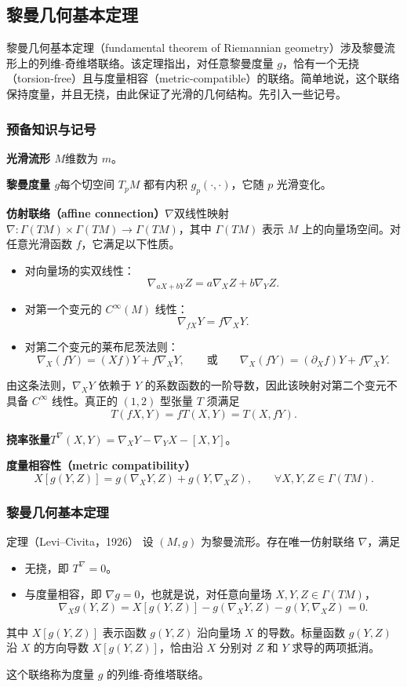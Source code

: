 \subsection{黎曼几何基本定理}
黎曼几何基本定理（fundamental theorem of Riemannian geometry）涉及黎曼流形上的列维-奇维塔联络。该定理指出，对任意黎曼度量 $g$，恰有一个无挠（torsion-free）且与度量相容（metric-compatible）的联络。简单地说，这个联络保持度量，并且无挠，由此保证了光滑的几何结构。先引入一些记号。

\subsubsection{预备知识与记号}
\textbf{光滑流形 $M$}\quad 维数为 $m$。

\textbf{黎曼度量 $g$}\quad 每个切空间 $T_pM$ 都有内积 $g_p(\cdot,\cdot)$，它随 $p$ 光滑变化。

\textbf{仿射联络（affine connection）$\nabla$}\quad 双线性映射
$\nabla\colon\Gamma(TM)\times\Gamma(TM)\to\Gamma(TM)$，其中 $\Gamma(TM)$ 表示 $M$ 上的向量场空间。对任意光滑函数 $f$，它满足以下性质。
\begin{itemize}
  \item 对向量场的实双线性：
  \[
    \nabla_{aX+bY}Z=a\nabla_XZ+b\nabla_YZ.
  \]
  \item 对第一个变元的 $C^\infty(M)$ 线性：
  \[
    \nabla_{fX}Y=f\nabla_XY.
  \]
  \item 对第二个变元的莱布尼茨法则：
  \[
    \nabla_X(fY)=(Xf)Y+f\nabla_XY,\qquad\text{或}\qquad
    \nabla_X(fY)=(\partial_Xf)Y+f\nabla_XY.
  \]
\end{itemize}

由这条法则，$\nabla_XY$ 依赖于 $Y$ 的系数函数的一阶导数，因此该映射对第二个变元不具备 $C^\infty$ 线性。真正的 $(1,2)$ 型张量 $T$ 须满足
\[
  T(fX,Y)=fT(X,Y)=T(X,fY).
\]

\textbf{挠率张量}\quad $T^\nabla(X,Y)=\nabla_XY-\nabla_YX-[X,Y]$。

\textbf{度量相容性（metric compatibility）}
\[
  X[g(Y,Z)]=g(\nabla_XY,Z)+g(Y,\nabla_XZ),
  \qquad \forall X,Y,Z\in\Gamma(TM).
\]

\subsubsection{黎曼几何基本定理}
\begin{statement}{定理}{（Levi–Civita，1926）}
设 $(M,g)$ 为黎曼流形。存在唯一仿射联络 $\nabla$，满足
\begin{itemize}
  \item 无挠，即 $T^\nabla=0$。
  \item 与度量相容，即 $\nabla g=0$，也就是说，对任意向量场 $X,Y,Z\in\Gamma(TM)$，
  \[
    \nabla_Xg(Y,Z)=X[g(Y,Z)]-g(\nabla_XY,Z)-g(Y,\nabla_XZ)=0.
  \]
\end{itemize}
其中 $X[g(Y,Z)]$ 表示函数 $g(Y,Z)$ 沿向量场 $X$ 的导数。标量函数 $g(Y,Z)$ 沿 $X$ 的方向导数 $X[g(Y,Z)]$，恰由沿 $X$ 分别对 $Z$ 和 $Y$ 求导的两项抵消。

这个联络称为度量 $g$ 的列维-奇维塔联络。
\end{statement}


